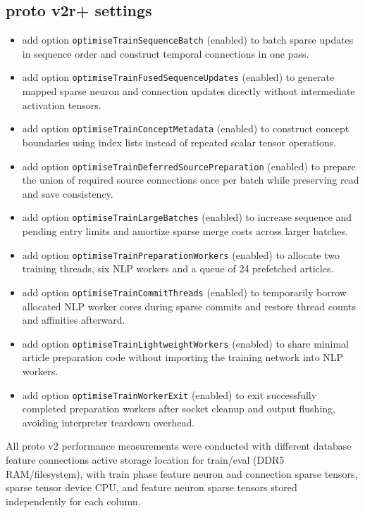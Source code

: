\subsection{proto v2r+ settings}
\begin{itemize}
	\item add option \texttt{optimiseTrainSequenceBatch} (enabled) to batch sparse updates in sequence order and construct temporal connections in one pass.
	\item add option \texttt{optimiseTrainFusedSequenceUpdates} (enabled) to generate mapped sparse neuron and connection updates directly without intermediate activation tensors.
	\item add option \texttt{optimiseTrainConceptMetadata} (enabled) to construct concept boundaries using index lists instead of repeated scalar tensor operations.
	\item add option \texttt{optimiseTrainDeferredSourcePreparation} (enabled) to prepare the union of required source connections once per batch while preserving read and save consistency.
	\item add option \texttt{optimiseTrainLargeBatches} (enabled) to increase sequence and pending entry limits and amortize sparse merge costs across larger batches.
	\item add option \texttt{optimiseTrainPreparationWorkers} (enabled) to allocate two training threads, six NLP workers and a queue of 24 prefetched articles.
	\item add option \texttt{optimiseTrainCommitThreads} (enabled) to temporarily borrow allocated NLP worker cores during sparse commits and restore thread counts and affinities afterward.
	\item add option \texttt{optimiseTrainLightweightWorkers} (enabled) to share minimal article preparation code without importing the training network into NLP workers.
	\item add option \texttt{optimiseTrainWorkerExit} (enabled) to exit successfully completed preparation workers after socket cleanup and output flushing, avoiding interpreter teardown overhead.
\end{itemize}


All proto v2 performance measurements were conducted with different database feature connections active storage location for train/eval (DDR5 RAM/filesystem), with train phase feature neuron and connection sparse tensors, sparse tensor device CPU, and feature neuron sparse tensors stored independently for each column. 

